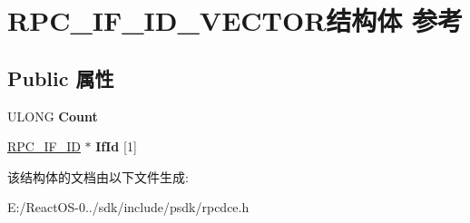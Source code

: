 \hypertarget{struct_r_p_c___i_f___i_d___v_e_c_t_o_r}{}\section{R\+P\+C\+\_\+\+I\+F\+\_\+\+I\+D\+\_\+\+V\+E\+C\+T\+O\+R结构体 参考}
\label{struct_r_p_c___i_f___i_d___v_e_c_t_o_r}
\subsection*{Public 属性}
\begin{DoxyCompactItemize}
\item 
\mbox{\label{struct_r_p_c___i_f___i_d___v_e_c_t_o_r_acdbeb5f562824ffe5ac035243e42cbd8}} 
U\+L\+O\+NG {\bfseries Count}
\item 
\mbox{\label{struct_r_p_c___i_f___i_d___v_e_c_t_o_r_ae2c2390060c0d6dc41a13b16b8a8a384}} 
\hyperlink{struct___r_p_c___i_f___i_d}{R\+P\+C\+\_\+\+I\+F\+\_\+\+ID} $\ast$ {\bfseries If\+Id} \mbox{[}1\mbox{]}
\end{DoxyCompactItemize}


该结构体的文档由以下文件生成\+:\begin{DoxyCompactItemize}
\item 
E\+:/\+React\+O\+S-\/0../sdk/include/psdk/rpcdce.\+h\end{DoxyCompactItemize}
